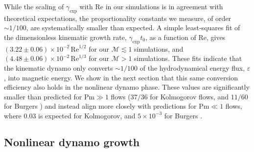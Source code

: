 \documentclass[12pt,twoside]{extreport}
\makeatletter
\newcommand{\mReh}{\ensuremath{\mathrm{Re}}} %
\newcommand{\mPrm}{\ensuremath{\mathrm{Pm}}} %
\newcommand{\mSonicMach}{\ensuremath{\mathcal{M}}} %
\providecommand{\DIFaddtex}[1]{{\protect\color{DIFgreen}\uwave{#1}}} %
\providecommand{\DIFdeltex}[1]{{\protect\color{DIFpurple}\sout{#1}}} %
\providecommand{\DIFaddbegin}{} %
\providecommand{\DIFaddend}{} %
\providecommand{\DIFdelbegin}{} %
\providecommand{\DIFdelend}{} %
\providecommand{\DIFadd}[1]{\texorpdfstring{\DIFaddtex{#1}}{#1}} %
\providecommand{\DIFdel}[1]{\texorpdfstring{\DIFdeltex{#1}}{}} %
\providecommand{\DIFscaledelfig}{0.5}
\newlength{\DIFdelgraphicswidth} %
\newlength{\DIFdelgraphicsheight} %
\providecommand{\DIFaddincludegraphics}[2][]{{\color{DIFgreen}\fbox{\DIFOincludegraphics[#1]{#2}}}} %
\providecommand{\DIFdelincludegraphics}[2][]{%
\sbox{\DIFdelgraphicsbox}{\DIFOincludegraphics[#1]{#2}}%
\settoboxwidth{\DIFdelgraphicswidth}{\DIFdelgraphicsbox} %
\settoboxtotalheight{\DIFdelgraphicsheight}{\DIFdelgraphicsbox} %
\scalebox{\DIFscaledelfig}{%
\parbox[b]{\DIFdelgraphicswidth}{\usebox{\DIFdelgraphicsbox}\\[-\baselineskip] \rule{\DIFdelgraphicswidth}{0em}}\llap{\resizebox{\DIFdelgraphicswidth}{\DIFdelgraphicsheight}{%
\setlength{\unitlength}{\DIFdelgraphicswidth}%
\begin{picture}(1,1)%
\thicklines\linethickness{2pt} %
{\color{DIFpurple}\put(0,0){\framebox(1,1){}}}%
{\color{DIFpurple}\put(0,0){\line( 1,1){1}}}%
{\color{DIFpurple}\put(0,1){\line(1,-1){1}}}%
\end{picture}%
}\hspace*{3pt}}} %
} %
\DeclareRobustCommand{\DIFaddbegin}{\DIFOaddbegin \let\includegraphics\DIFaddincludegraphics} %
\DeclareRobustCommand{\DIFaddend}{\DIFOaddend \let\includegraphics\DIFOincludegraphics} %
\DeclareRobustCommand{\DIFdelbegin}{\DIFOdelbegin \let\includegraphics\DIFdelincludegraphics} %
\DeclareRobustCommand{\DIFdelend}{\DIFOaddend \let\includegraphics\DIFOincludegraphics} %
\let\sout@orig\sout %
\renewcommand{\sout}[1]{\ifmmode\text{\sout@orig{\ensuremath{#1}}}\else\sout@orig{#1}\fi} %
\makeatother
\begin{document}
    While the scaling of $\gamma_\mathrm{exp}$ with $\mReh$ in our simulations is in agreement with theoretical expectations, the proportionality constants we measure, of order $\sim 1/100$, are systematically smaller than expected. A simple least-squares fit of the dimensionless kinematic growth rate, \DIFdelbegin \DIFdel{$\gamma_\mathrm{exp} t_0$}\DIFdelend \DIFaddbegin \DIFadd{$\gamma_\mathrm{exp} t_\mathrm{turb}$}\DIFaddend , as a function of $\mReh$, gives $(3.22 \pm 0.06) \times 10^{-2} \,\mReh^{1/2}$ for our $\mSonicMach \lesssim 1$ simulations, and $(4.48 \pm 0.06) \times 10^{-2} \,\mReh^{1/3}$ for our $\mSonicMach > 1$ simulations. These fits indicate that the kinematic dynamo only converts $\sim 1/100$ of the hydrodynamical energy flux, $\varepsilon$, into magnetic energy. We show in the next section that this same conversion efficiency also holds in the nonlinear dynamo phase. These values are significantly smaller than predicted for $\mPrm \gg 1$ flows ($37/36$ for Kolmogorov flows, and $11/60$ for Burgers \citep{schober2012small, schober2012magnetic}) and instead align more closely with predictions for $\mPrm \ll 1$ flows, where $0.03$ is expected for Kolmogorov, and $5\times10^{-3}$ for Burgers \citep{schober2012small, schober2012magnetic, bovino2013turbulent}.

\subsection{Nonlinear dynamo growth}
\end{document}

